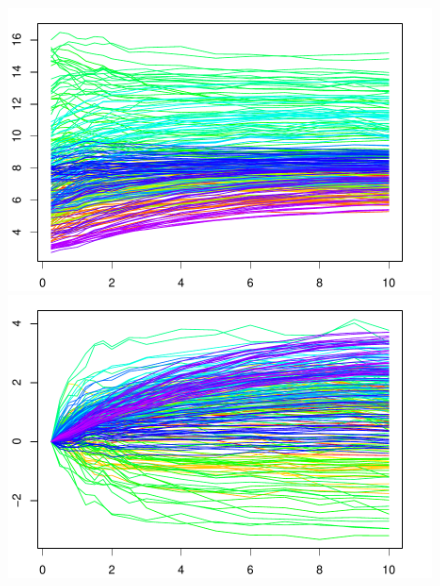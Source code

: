 \documentclass[
	12pt,				%
	openright,			%
	oneside,			%
	a4paper,			%
	english,			%
	brazil				%
	]{dissertacao-ufrgs-abntex2}
\begin{document}
\begin{figure}[htp]
  \centering
  \begin{minipage}[t]{0.45\linewidth}
    \centering
    \begin{minipage}[t]{\linewidth}
      \centering     \includegraphics[width=\textwidth]{anexos/perfil_curvas_retira0.pdf}
    \end{minipage}
    \begin{minipage}[b]{\linewidth}
      \centering     \includegraphics[width=\textwidth]{anexos/perfil_curvas_retira1.pdf} 
    \end{minipage}
  \end{minipage}
  \begin{minipage}[t]{0.45\linewidth}
    \centering
    \begin{minipage}[t]{\linewidth}

\end{minipage}
\end{minipage}
\end{figure}
\end{document}
